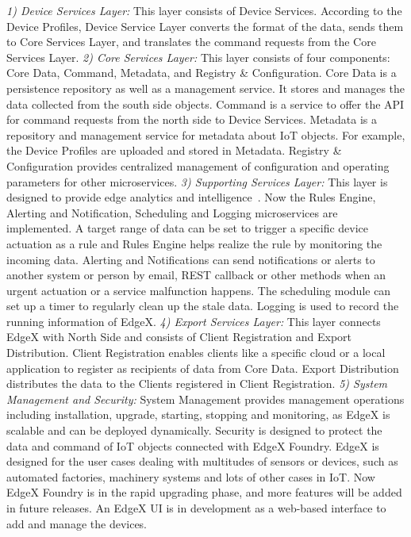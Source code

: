 \textit{1) Device Services Layer:}
This layer consists of Device Services. According to the Device Profiles, Device Service Layer converts the format of the data, sends them to Core Services Layer, and translates the command requests from the Core Services Layer.
\textit{2) Core Services Layer:}
This layer consists of four components: Core Data, Command, Metadata, and Registry \& Configuration. Core Data is a persistence repository as well as a management service. It stores and manages the data collected from the south side objects. Command is a service to offer the API for command requests from the north side to Device Services. Metadata is a repository and management service for metadata about IoT objects. For example, the Device Profiles are uploaded and stored in Metadata. Registry \& Configuration provides centralized management of configuration and operating parameters for other microservices. 
\textit{3) Supporting Services Layer:}
This layer is designed to provide edge analytics and intelligence~. Now the Rules Engine, Alerting and Notification, Scheduling and Logging microservices are implemented. A target range of data can be set to trigger a specific device actuation as a rule and Rules Engine helps realize the rule by monitoring the incoming data. Alerting and Notifications can send notifications or alerts to another system or person by email, REST callback or other methods when an urgent actuation or a service malfunction happens. The scheduling module can set up a timer to regularly clean up the stale data. Logging is used to record the running information of EdgeX.
\textit{4) Export Services Layer:}
This layer connects EdgeX with North Side and consists of Client Registration and Export Distribution. Client Registration enables clients like a specific cloud or a local application to register as recipients of data from Core Data. Export Distribution distributes the data to the Clients registered in Client Registration. 
\textit{5) System Management and Security:}
System Management provides management operations including installation, upgrade, starting, stopping and monitoring, as EdgeX is scalable and can be deployed dynamically. Security is designed to protect the data and command of IoT objects connected with EdgeX Foundry.
EdgeX is designed for the user cases dealing with multitudes of sensors or devices, such as automated factories, machinery systems and lots of other cases in IoT. Now EdgeX Foundry is in the rapid upgrading phase, and more features will be added in future releases. An EdgeX UI is in development as a web-based interface to add and manage the devices.

